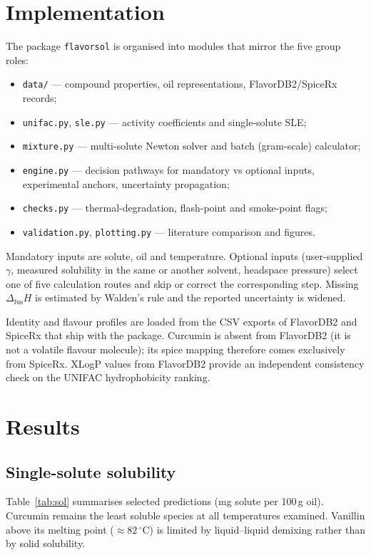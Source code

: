 \documentclass[twocolumn,10pt]{article}
\begin{document}
\section{Implementation}

The package \texttt{flavorsol} is organised into modules that mirror the five group roles:

\begin{itemize}
\item \texttt{data/} --- compound properties, oil representations, FlavorDB2/SpiceRx records;
\item \texttt{unifac.py}, \texttt{sle.py} --- activity coefficients and single-solute SLE;
\item \texttt{mixture.py} --- multi-solute Newton solver and batch (gram-scale) calculator;
\item \texttt{engine.py} --- decision pathways for mandatory vs optional inputs, experimental anchors, uncertainty propagation;
\item \texttt{checks.py} --- thermal-degradation, flash-point and smoke-point flags;
\item \texttt{validation.py}, \texttt{plotting.py} --- literature comparison and figures.
\end{itemize}

Mandatory inputs are solute, oil and temperature. Optional inputs (user-supplied $\gamma$, measured solubility in the same or another solvent, headspace pressure) select one of five calculation routes and skip or correct the corresponding step. Missing $\Delta_{\mathrm{fus}}H$ is estimated by Walden's rule and the reported uncertainty is widened.

Identity and flavour profiles are loaded from the CSV exports of FlavorDB2 and SpiceRx that ship with the package. Curcumin is absent from FlavorDB2 (it is not a volatile flavour molecule); its spice mapping therefore comes exclusively from SpiceRx. XLogP values from FlavorDB2 provide an independent consistency check on the UNIFAC hydrophobicity ranking.

\section{Results}

\subsection{Single-solute solubility}
Table~\ref{tab:sol} summarises selected predictions (mg solute per 100\,g oil). Curcumin remains the least soluble species at all temperatures examined. Vanillin above its melting point ($\approx 82\,^\circ$C) is limited by liquid--liquid demixing rather than by solid solubility.
\end{document}
